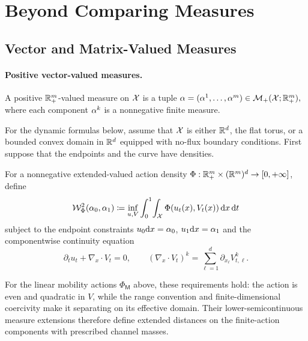 \section{Beyond Comparing Measures}
\label{sec-beyond-comparing-measures}
\subsection{Vector and Matrix-Valued Measures}
\label{sec-vector-matrix-valued-measures}
\paragraph{Positive vector-valued measures.}
\begin{defn}\label{def-positive-vector-valued-measure}
A positive $\mathbb{R}_+^m$-valued measure on $\mathcal{X}$ is a tuple
\(\alpha=(\alpha^1,\ldots,\alpha^m)\in\mathcal{M}_+(\mathcal{X};\mathbb{R}_+^m),\)
where each component $\alpha^k$ is a nonnegative finite measure.
\end{defn}
For the dynamic formulas below, assume that $\mathcal{X}$ is either $\mathbb{R}^d$, the flat torus, or a bounded convex domain in $\mathbb{R}^d$ equipped with no-flux boundary conditions. First suppose that the endpoints and the curve have densities.

\begin{defn}\label{def-vector-valued-dynamic-transport}
For a nonnegative extended-valued action density $\Phi:\mathbb{R}_+^m\times(\mathbb{R}^m)^d\to[0,+\infty]$, define
\begin{equation}\label{eq-vector-valued-bb}
\mathcal W_{\Phi}^2(\alpha_0,\alpha_1)
\coloneqq
\inf_{u,V}
\int_0^1\!\int_{\mathcal{X}}
\Phi(u_t(x),V_t(x))\,\mathrm{d} x\,\mathrm{d} t
\end{equation}
subject to the endpoint constraints $u_0\mathrm{d} x=\alpha_0$, $u_1\mathrm{d} x=\alpha_1$ and the componentwise continuity equation
\begin{equation}\label{eq-vector-valued-continuity}
\partial_t u_t+\nabla_x\cdot V_t=0,
\qquad
(\nabla_x\cdot V_t)^k=\sum_{\ell=1}^d \partial_{x_\ell} V_{t,\ell}^k.
\end{equation}
\end{defn}
For the linear mobility actions $\Phi_{\mathsf M}$ above, these requirements hold: the action is even and quadratic in $V$, while the range convention and finite-dimensional coercivity make it separating on its effective domain. Their lower-semicontinuous measure extensions therefore define extended distances on the finite-action components with prescribed channel masses.

